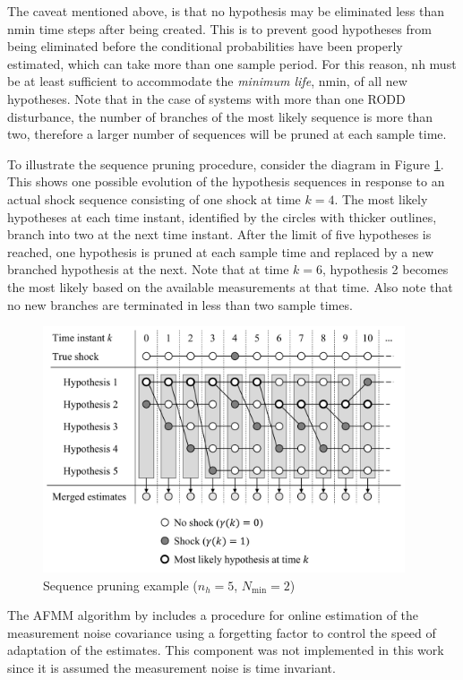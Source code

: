The caveat mentioned above, is that no hypothesis may be eliminated less than \gls{nmin} time steps after being created. This is to prevent good hypotheses from being eliminated before the conditional probabilities have been properly estimated, which can take more than one sample period. For this reason, \gls{nh} must be at least sufficient to accommodate the \textit{minimum life}, \gls{nmin}, of all new hypotheses. Note that in the case of systems with more than one \gls{RODD} disturbance, the number of branches of the most likely sequence is more than two, therefore a larger number of sequences will be pruned at each sample time.

To illustrate the sequence pruning procedure, consider the diagram in Figure \ref{fig:mm-obs-seq-SP}. This shows one possible evolution of the hypothesis sequences in response to an actual shock sequence consisting of one shock at time $k=4$.  The most likely hypotheses at each time instant, identified by the circles with thicker outlines, branch into two at the next time instant. After the limit of five hypotheses is reached, one hypothesis is pruned at each sample time and replaced by a new branched hypothesis at the next. Note that at time $k=6$, hypothesis 2 becomes the most likely based on the available measurements at that time. Also note that no new branches are terminated in less than two sample times.

\begin{figure}[htp]
	\centering
	\includegraphics[width=10.7cm]{images/mm_obs_seq_SP.pdf}
	\caption{Sequence pruning example ($n_h=5$, $N_\text{min}=2$)}
	\label{fig:mm-obs-seq-SP}
\end{figure}

The \gls{AFMM} algorithm by \cite{gustafsson_estimation_1993} includes a procedure for online estimation of the measurement noise covariance using a forgetting factor to control the speed of adaptation of the estimates. This component was not implemented in this work since it is assumed the measurement noise is time invariant.

